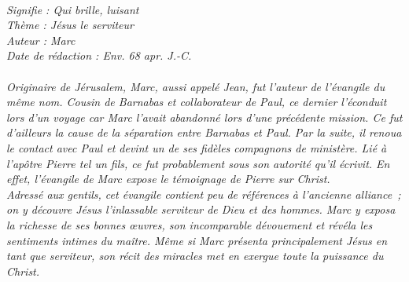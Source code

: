 \BFont
\noindent\hrulefill
\textit{
\bigskip
{\centering{}
\\Signifie : Qui brille, luisant
\\Thème : Jésus le serviteur
\\Auteur : Marc
\\Date de rédaction : Env. 68 apr. J.-C.\\}
}
\textit{
\\Originaire de Jérusalem, Marc, aussi appelé Jean, fut l’auteur de l’évangile du même nom. Cousin de Barnabas et collaborateur de Paul, ce dernier l’éconduit lors d’un voyage car Marc l’avait abandonné lors d’une précédente mission. Ce fut d’ailleurs la cause de la séparation entre Barnabas et Paul.  Par la suite, il renoua le contact avec Paul et devint un de ses fidèles compagnons de ministère. Lié à l’apôtre Pierre tel un fils, ce fut probablement sous son autorité qu’il écrivit. En effet, l’évangile de Marc expose le témoignage de Pierre sur Christ.
\bigskip
\\Adressé aux gentils, cet évangile contient peu de références à l’ancienne alliance ; on y découvre Jésus l’inlassable serviteur de Dieu et des hommes. Marc y exposa la richesse de ses bonnes œuvres, son incomparable dévouement et révéla les sentiments intimes du maître. Même si Marc présenta principalement Jésus en tant que serviteur, son récit des miracles met en exergue toute la puissance du Christ.\bigskip
}
\par\nobreak\noindent\hrulefill
